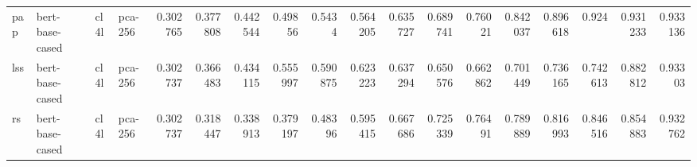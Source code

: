 \begin{tabular}{llllrrrrrrrrrrrrrr}
 pap         & bert-base-cased     & cl4l             & pca-256               &     0.302765 &     0.377808 &     0.442544 &     0.49856  &     0.5434   &     0.564205 &     0.635727 &     0.689741 &     0.76021  &     0.842037 &      0.896618 &      0.924    &      0.931233 &      0.933136 \\
 lss         & bert-base-cased     & cl4l             & pca-256               &     0.302737 &     0.366483 &     0.434115 &     0.555997 &     0.590875 &     0.623223 &     0.637294 &     0.650576 &     0.662862 &     0.701449 &      0.736165 &      0.742613 &      0.882812 &      0.93303  \\
 rs          & bert-base-cased     & cl4l             & pca-256               &     0.302737 &     0.318447 &     0.338913 &     0.379197 &     0.48396  &     0.595415 &     0.667686 &     0.725339 &     0.76491  &     0.789889 &      0.816993 &      0.846516 &      0.854883 &      0.932762 \\
\hline
\end{tabular}
